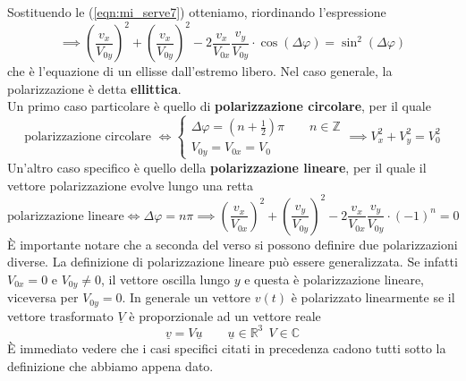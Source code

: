 \documentclass{book}
\begin{document}
        Sostituendo le (\ref{eqn:mi_serve7}) otteniamo, riordinando l'espressione
        \begin{equation}
            \implies (\frac{v_{x}}{V_{0y}})^{2}+(\frac{v_{x}}{V_{0y}})^{2}-2\frac{v_{x}}{V_{0x}}\frac{v_{y}}{V_{0y}}\cdot \cos(\Delta \varphi) = \sin^{2}(\Delta \varphi)
        \end{equation}
        che è l'equazione di un ellisse dall'estremo libero. Nel caso generale, la polarizzazione è detta \textbf{ellittica}. \\
        Un primo caso particolare è quello di \textbf{polarizzazione circolare}, per il quale
        \begin{equation}
            \textrm{polarizzazione circolare } \iff 
            \begin{cases}
            \Delta \varphi = (n+\frac{1}{2})\pi \qquad n \in \mathbb{Z} \\
            V_{0y} = V_{0x} = V_{0}
            \end{cases} \implies V_{x} ^{2}+V_{y} ^{2} = V_{0}^{2}
        \end{equation}
        Un'altro caso specifico è quello della \textbf{polarizzazione lineare}, per il quale il vettore polarizzazione evolve lungo una retta 
        \begin{equation}
            \textrm{polarizzazione lineare} \iff \Delta \varphi = n\pi \implies (\frac{v_{x}}{V_{0x}})^{2} + (\frac{v_{y}}{V_{0y}})^{2} -2 \frac{v_{x}}{V_{0x}}\frac{v_{y}}{V_{0y}} \cdot (-1)^{n} = 0 
        \end{equation}
        È importante notare che a seconda del verso si possono definire due polarizzazioni diverse. La definizione di polarizzazione lineare può essere generalizzata. Se infatti $V_{0x}=0$ e $V_{0y} \neq 0$,
        il vettore oscilla lungo $y$ e questa è polarizzazione lineare, viceversa per $V_{0y}=0$. In generale un vettore $v(t)$ è polarizzato linearmente se il vettore trasformato $\underline{V}$ è proporzionale ad un vettore reale
        \begin{equation}
            \underline{v} = V \underline{u} \qquad \underline{u} \in \mathbb{R} ^{3} \ \ V \in \mathbb{C}
        \end{equation}
        È immediato vedere che i casi specifici citati in precedenza cadono tutti sotto la definizione che abbiamo appena dato.
\end{document}
